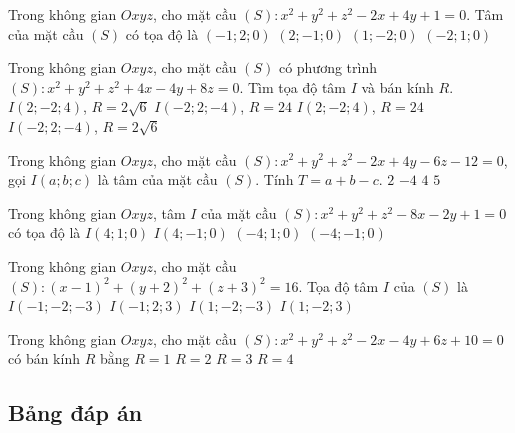 \begin{ex}%
	Trong không gian $Oxyz$, cho mặt cầu $(S)\colon x^2+y^2+z^2-2x+4y+1=0$. Tâm của mặt cầu $(S)$ có tọa độ là
	\choice
	{$(-1;2;0)$}
	{$(2;-1;0)$}
	{\True $(1;-2;0)$}
	{$(-2;1;0)$}
\end{ex}
\begin{ex}%
	Trong không gian $Oxyz$, cho mặt cầu $(S)$ có phương trình $(S)\colon x^2+y^2+z^2+4x-4y+8z=0$. Tìm tọa độ tâm $I$ và bán kính $R$.
	\choice
	{$I(2;-2;4)$, $R=2\sqrt{6}$}
	{$I(-2;2;-4)$, $R=24$}
	{$I(2;-2;4)$, $R=24$}
	{\True $I(-2;2;-4)$, $R=2\sqrt{6}$}
\end{ex}
\begin{ex}%
	Trong không gian $Oxyz$, cho mặt cầu $(S)\colon x^2+y^2+z^2-2x+4y-6z-12=0$, gọi $I(a;b;c)$ là tâm của mặt cầu $(S)$. Tính $T=a+b-c$.
	\choice
	{$2$}
	{\True $-4$}
	{$4$}
	{$5$}
\end{ex}
\begin{ex}%
	Trong không gian $Oxyz$, tâm $I$ của mặt cầu $(S)\colon x^2+y^2+z^2-8x-2y+1=0$ có tọa độ là
	\choice
	{\True $I(4;1;0)$}
	{$I(4;-1;0)$}
	{$(-4;1;0)$}
	{$(-4;-1;0)$}
\end{ex}
\begin{ex}%
	Trong không gian $Oxyz$, cho mặt cầu $(S)\colon (x-1)^2+(y+2)^2+(z+3)^2=16$. Tọa độ tâm $I$ của $(S)$ là
	\choice
	{$I(-1;-2;-3)$}
	{$I(-1;2;3)$}
	{\True $I(1;-2;-3)$}
	{$I(1;-2;3)$}
\end{ex}
\begin{ex}%
	Trong không gian $Oxyz$, cho mặt cầu $(S)\colon x^2+y^2+z^2-2x-4y+6z+10=0$ có bán kính $R$ bằng
	\choice
	{$R=1$}
	{\True $R=2$}
	{$R=3$}
	{$R=4$}
\end{ex}
\subsection{Bảng đáp án}

